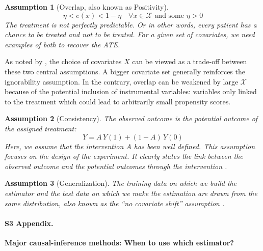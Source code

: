 \documentclass[10pt,letterpaper]{article}
\newtheorem{assumption}{Assumption}
\begin{document}
\begin{assumption}[Overlap, also known as Positivity]\label{assumption:overlap}
    \begin{equation}\label{eq:overlap}
        \eta < e(x) < 1 - \eta \quad \forall x \in \mathcal{X} \text{ and some }   \eta > 0
    \end{equation}
    The treatment is not perfectly predictable. Or in other words, every
    patient has a chance to be treated and not to be treated. For a given set of
    covariates, we need examples of both to recover the ATE.
\end{assumption}

As noted by \cite{damour2020overlap}, the choice of covariates $X$ can
be viewed as a trade-off between these two central assumptions. A bigger
covariate set generally reinforces the ignorability assumption. In the
contrary, overlap can be weakened by large $\mathcal{X}$ because of the
potential inclusion of instrumental variables: variables only linked to the treatment which
could lead to arbitrarily small propensity scores.


\begin{assumption}[Consistency]\label{assumption:consistency} The observed
    outcome is the potential outcome of the assigned treatment:
    \begin{equation}\label{eq:consistancy}
        Y = A \, Y(1) + (1-A) \, Y(0)
    \end{equation}
    Here, we assume that the intervention $A$ has been well defined. This
    assumption focuses on the design of the experiment. It clearly states the link
    between the observed outcome and the potential outcomes through the
    intervention \cite{hernan2020causal}.
\end{assumption}

\begin{assumption}[Generalization]\label{assumption:generalization} The training
    data on which we build the estimator and the test data on which we make the
    estimation are drawn from the same distribution, also known as
    the ``no covariate shift'' assumption \cite{jesson2020identifying}.
\end{assumption}



\paragraph*{S3 Appendix.}
\label{apd:causal_estimators}
{\bf Major causal-inference methods: When to use which estimator?}
\end{document}
